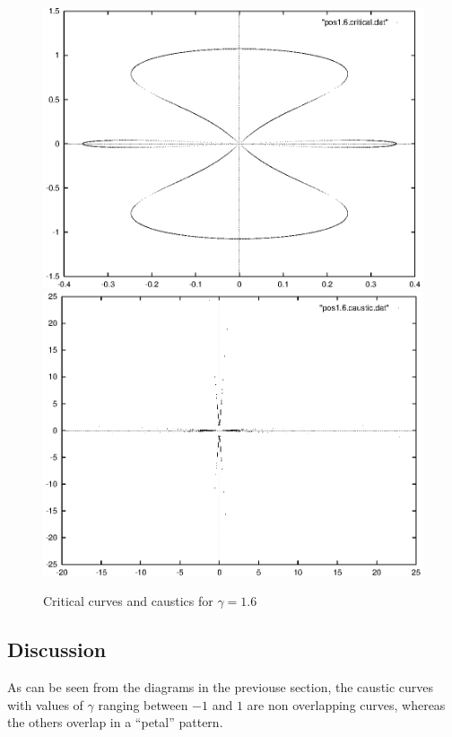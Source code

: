 \documentclass[aspectratio=1610,xcolor=dvipsnames,t]{beamer}
\begin{document}
    \begin{figure} 
        \caption{Critical curves and caustics for $\gamma = 1.6$} 
        \label{fig:critical-gamma1-6} 
        \begin{center}
            \includegraphics[width=\columnwidth]{images/pos1-6-critical.eps} 
            \includegraphics[width=\columnwidth]{images/pos1-6-caustic.eps} 
        \end{center}
    \end{figure}

    \subsection{Discussion}
    As can be seen from the diagrams in the previouse section, 
    the caustic curves with values of $\gamma$ ranging between
    $-1$ and $1$ are non overlapping curves, whereas the others
    overlap in a ``petal'' pattern.
\end{document}
